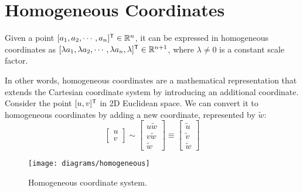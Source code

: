 \clearpage
\section{Homogeneous Coordinates} \label{sec:homogeneous}

\begin{definition}
    Given a point $[a_1, a_2, \cdots, a_n]^{\mathsf{T}} \in \mathbb{R}^n$, it can be expressed in homogeneous coordinates as $[\lambda a_1, \lambda a_2, \cdots, \lambda a_n, \lambda]^{\mathsf{T}} \in \mathbb{R}^{n+1}$, where $\lambda \neq 0$ is a constant scale factor.
\end{definition}
In other words, homogeneous coordinates are a mathematical representation that extends the Cartesian coordinate system by introducing an additional coordinate. Consider the point $[u, v]^{\mathsf{T}}$ in 2D Euclidean space. We can convert it to homogeneous coordinates by adding a new coordinate, represented by $\widetilde{w}$:
\begin{equation}
    \begin{bmatrix}
        u \\ v
    \end{bmatrix}
    \sim
    \begin{bmatrix}
        u\widetilde{w} \\ v\widetilde{w} \\ \widetilde{w}
    \end{bmatrix}
    \equiv
    \begin{bmatrix}
        \widetilde{u} \\ \widetilde{v} \\ \widetilde{w}
    \end{bmatrix}
\end{equation}

\begin{figure}[H]
    \centering
    \texttt{[image: diagrams/homogeneous]}
    \caption{Homogeneous coordinate system.}\label{fig:homo}
\end{figure}

